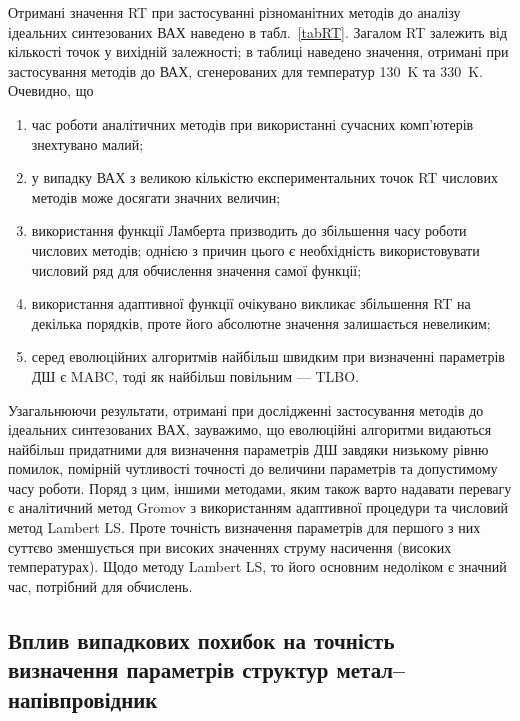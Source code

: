 Отримані значення RT при застосуванні різноманітних методів до аналізу ідеальних синтезованих ВАХ наведено в табл.~\ref{tabRT}.
Загалом RT залежить від кількості точок у вихідній залежності;
в таблиці наведено значення, отримані при застосування методів до ВАХ, сгенерованих для температур 130~K та 330~K.
Очевидно, що
\begin{enumerate}[label=\asbuk*),leftmargin=0em,itemindent=1.5em]
\item час роботи аналітичних методів при використанні сучасних комп'ютерів знехтувано малий;
\item у випадку ВАХ з великою кількістю експериментальних точок RT числових методів може досягати значних величин;
\item використання функції Ламберта призводить до збільшення часу роботи числових методів; однією з причин цього є необхідність використовувати числовий ряд для обчислення значення самої функції;
\item використання адаптивної функції очікувано викликає збільшення RT на декілька порядків, проте його абсолютне значення залишається невеликим;
\item серед еволюційних алгоритмів найбільш швидким при визначенні параметрів ДШ є MABC, тоді як найбільш повільним --- TLBO.
\end{enumerate}


Узагальнюючи результати, отримані при дослідженні застосування методів до ідеальних синтезованих ВАХ, зауважимо,
що еволюційні алгоритми видаються найбільш придатними для визначення параметрів ДШ завдяки низькому рівню помилок, помірній чутливості точності до величини параметрів
та допустимому часу роботи.
Поряд з цим, іншими методами, яким також варто надавати перевагу є аналітичний метод Gromov з використанням адаптивної процедури та числовий метод Lambert LS.
Проте точність визначення параметрів для першого з них суттєво зменшується при високих значеннях струму насичення (високих температурах).
Щодо методу Lambert LS, то його основним недоліком є значний час, потрібний для обчислень.


\subsection{Вплив випадкових похибок на точність визначення параметрів структур метал--напівпровідник}

